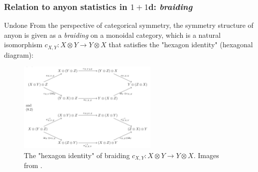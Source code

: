 \documentclass{ltjsarticle}
\theoremstyle{mystyle} %
\numberwithin{equation}{section}
\begin{document}
\subsubsection{Relation to anyon statistics in $1+1$d: \textit{braiding}}
\color{red}
Undone
\color{black}
From the perspective of categorical symmetry, 
the symmetry structure of anyon is given as a \textit{braiding} on a monoidal category, 
which is a natural isomorphism $c_{X,Y}: X\otimes Y \to Y\otimes X$
 that satisfies the "hexagon identity" (hexagonal diagram): 
 \begin{figure}[H]
    \centering
    \includegraphics[width=0.6\textwidth]{hexagon.jpeg}
    \caption{The "hexagon identity" of braiding $c_{X,Y}: X\otimes Y \to Y\otimes X$. 
    Images from \cite{PESGDNVO}. }
    \label{lrunits}
\end{figure}
\end{document}
